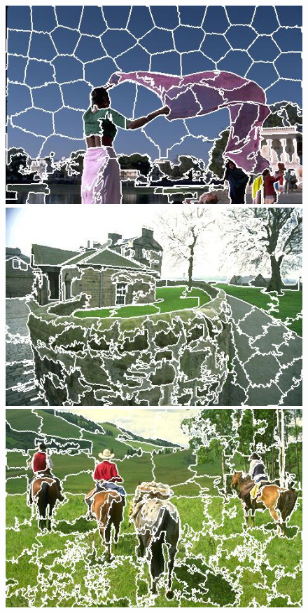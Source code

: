 \begin{figure}[h]
{\begin{minipage}[b]{0.13\linewidth}
\includegraphics[width=1\linewidth]{figures/img/LSC/LSC_80085.jpg}
\includegraphics[width=1\linewidth]{figures/img/LSC/LSC_92014.jpg}
\includegraphics[width=1\linewidth]{figures/img/LSC/LSC_220003.jpg}

\end{minipage}}
\end{figure}
